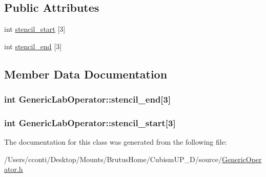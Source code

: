 \subsection*{Public Attributes}
\begin{DoxyCompactItemize}
\item 
int \hyperlink{class_generic_lab_operator_a007ab6ad6deb024d839d1d03241672c0}{stencil\+\_\+start} \mbox{[}3\mbox{]}
\item 
int \hyperlink{class_generic_lab_operator_a4daf37ba8c5a018f2b779d8636aba63f}{stencil\+\_\+end} \mbox{[}3\mbox{]}
\end{DoxyCompactItemize}


\subsection{Member Data Documentation}
\hypertarget{class_generic_lab_operator_a4daf37ba8c5a018f2b779d8636aba63f}{}
\subsubsection[{stencil\+\_\+end}]{\setlength{\rightskip}{0pt plus 5cm}int Generic\+Lab\+Operator\+::stencil\+\_\+end\mbox{[}3\mbox{]}}\label{class_generic_lab_operator_a4daf37ba8c5a018f2b779d8636aba63f}
\hypertarget{class_generic_lab_operator_a007ab6ad6deb024d839d1d03241672c0}{}
\subsubsection[{stencil\+\_\+start}]{\setlength{\rightskip}{0pt plus 5cm}int Generic\+Lab\+Operator\+::stencil\+\_\+start\mbox{[}3\mbox{]}}\label{class_generic_lab_operator_a007ab6ad6deb024d839d1d03241672c0}


The documentation for this class was generated from the following file\+:\begin{DoxyCompactItemize}
\item 
/\+Users/cconti/\+Desktop/\+Mounts/\+Brutus\+Home/\+Cubism\+U\+P\+\_\+D/source/\hyperlink{_generic_operator_8h}{Generic\+Operator.\+h}\end{DoxyCompactItemize}
